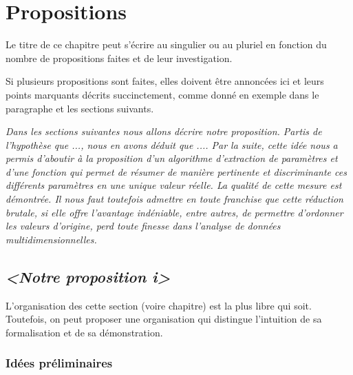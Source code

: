 \documentclass[11pt, french]{report-rd-info}
\begin{document}


\chapter{Propositions}
\label{chap:Propositions}

Le titre de ce chapitre peut s'écrire au singulier ou au pluriel en fonction du nombre de propositions faites et de leur investigation.

Si plusieurs propositions sont faites, elles doivent être annoncées ici et leurs points marquants décrits succinctement, comme donné en exemple dans le paragraphe et les sections suivants.

\bigskip

\emph{Dans les sections suivantes nous allons décrire notre proposition. Partis de l'hypothèse que ..., nous en avons déduit que .... Par la suite, cette idée nous a permis d'aboutir à la proposition d'un algorithme d'extraction de paramètres et d'une fonction qui permet de résumer de manière pertinente et discriminante ces différents paramètres en une unique valeur réelle. La qualité de cette mesure est démontrée. Il nous faut toutefois admettre en toute franchise que cette réduction brutale, si elle offre l'avantage indéniable, entre autres, de permettre d'ordonner les valeurs d'origine, perd toute finesse dans l'analyse de données multidimensionnelles.}

\section{\emph{<Notre proposition \textit{i}>}}

L'organisation des cette section (voire chapitre) est la plus libre qui soit. Toutefois, on peut proposer une organisation qui distingue l'intuition de sa formalisation et de sa démonstration.

\subsection{Idées préliminaires}
\end{document}
